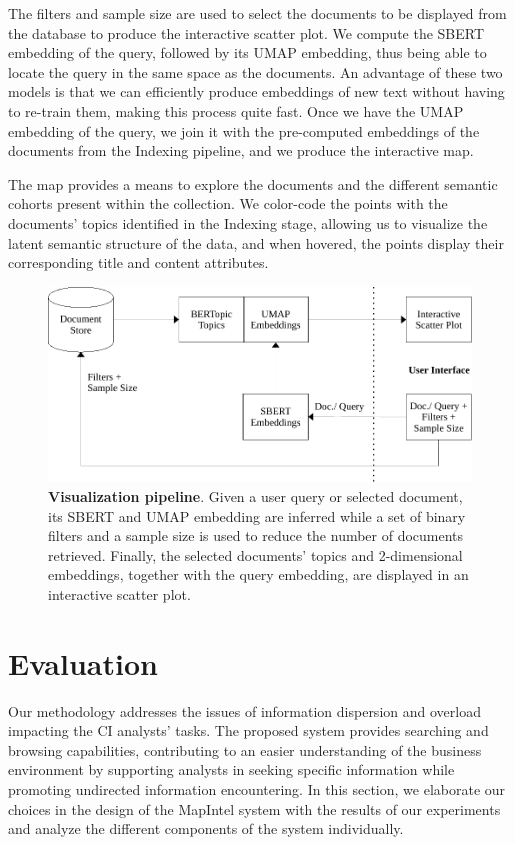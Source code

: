 \documentclass[a4paper]{article}
\begin{document}
The filters and sample size are used to select the documents to be displayed from the database to produce the interactive scatter plot. We compute the SBERT embedding of the query, followed by its UMAP embedding, thus being able to locate the query in the same space as the documents. An advantage of these two models is that we can efficiently produce embeddings of new text without having to re-train them, making this process quite fast. Once we have the UMAP embedding of the query, we join it with the pre-computed embeddings of the documents from the Indexing pipeline, and we produce the interactive map.

The map provides a means to explore the documents and the different semantic cohorts present within the collection. We color-code the points with the documents' topics identified in the Indexing stage, allowing us to visualize the latent semantic structure of the data, and when hovered, the points display their corresponding title and content attributes.

\begin{figure}[H]
	\centering
	\includegraphics[scale=0.7]{./assets/vis_pipeline}
	\caption{\textbf{Visualization pipeline}. Given a user query or selected document, its SBERT and UMAP embedding are inferred while a set of binary filters and a sample size is used to reduce the number of documents retrieved. Finally, the selected documents' topics and 2-dimensional embeddings, together with the query embedding, are displayed in an interactive scatter plot.}
	\label{vis_pipeline}
\end{figure}

\section{Evaluation}
Our methodology addresses the issues of information dispersion and overload impacting the CI analysts' tasks. The proposed system provides searching and browsing capabilities, contributing to an easier understanding of the business environment by supporting analysts in seeking specific information while promoting undirected information encountering. In this section, we elaborate our choices in the design of the MapIntel system with the results of our experiments and analyze the different components of the system individually.
\end{document}
